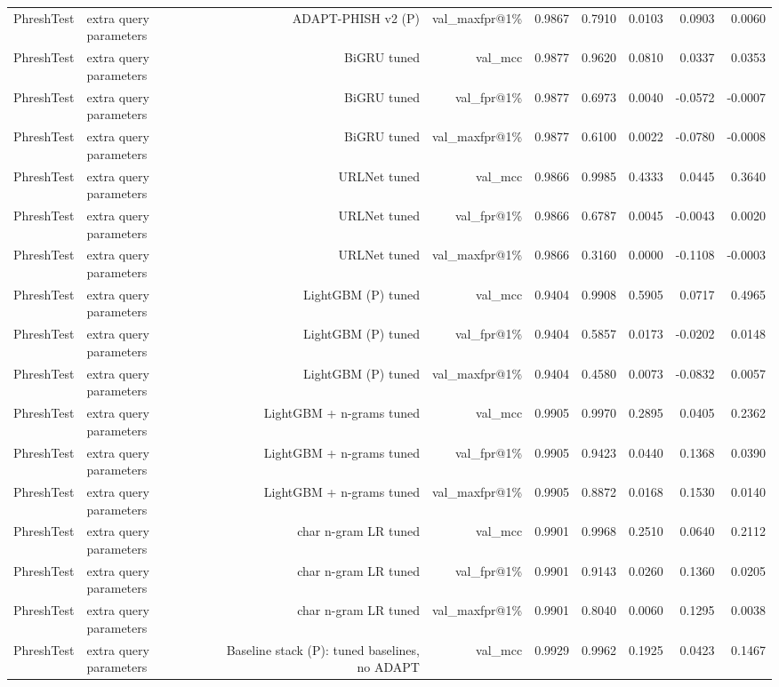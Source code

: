 \begin{table}[t]
\begin{tabular}{llrrrrrrr}
PhreshTest & extra query parameters & ADAPT-PHISH v2 (P) & val\_maxfpr@1\% & 0.9867 & 0.7910 & 0.0103 & 0.0903 & 0.0060 \\
PhreshTest & extra query parameters & BiGRU tuned & val\_mcc & 0.9877 & 0.9620 & 0.0810 & 0.0337 & 0.0353 \\
PhreshTest & extra query parameters & BiGRU tuned & val\_fpr@1\% & 0.9877 & 0.6973 & 0.0040 & -0.0572 & -0.0007 \\
PhreshTest & extra query parameters & BiGRU tuned & val\_maxfpr@1\% & 0.9877 & 0.6100 & 0.0022 & -0.0780 & -0.0008 \\
PhreshTest & extra query parameters & URLNet tuned & val\_mcc & 0.9866 & 0.9985 & 0.4333 & 0.0445 & 0.3640 \\
PhreshTest & extra query parameters & URLNet tuned & val\_fpr@1\% & 0.9866 & 0.6787 & 0.0045 & -0.0043 & 0.0020 \\
PhreshTest & extra query parameters & URLNet tuned & val\_maxfpr@1\% & 0.9866 & 0.3160 & 0.0000 & -0.1108 & -0.0003 \\
PhreshTest & extra query parameters & LightGBM (P) tuned & val\_mcc & 0.9404 & 0.9908 & 0.5905 & 0.0717 & 0.4965 \\
PhreshTest & extra query parameters & LightGBM (P) tuned & val\_fpr@1\% & 0.9404 & 0.5857 & 0.0173 & -0.0202 & 0.0148 \\
PhreshTest & extra query parameters & LightGBM (P) tuned & val\_maxfpr@1\% & 0.9404 & 0.4580 & 0.0073 & -0.0832 & 0.0057 \\
PhreshTest & extra query parameters & LightGBM + n-grams tuned & val\_mcc & 0.9905 & 0.9970 & 0.2895 & 0.0405 & 0.2362 \\
PhreshTest & extra query parameters & LightGBM + n-grams tuned & val\_fpr@1\% & 0.9905 & 0.9423 & 0.0440 & 0.1368 & 0.0390 \\
PhreshTest & extra query parameters & LightGBM + n-grams tuned & val\_maxfpr@1\% & 0.9905 & 0.8872 & 0.0168 & 0.1530 & 0.0140 \\
PhreshTest & extra query parameters & char n-gram LR tuned & val\_mcc & 0.9901 & 0.9968 & 0.2510 & 0.0640 & 0.2112 \\
PhreshTest & extra query parameters & char n-gram LR tuned & val\_fpr@1\% & 0.9901 & 0.9143 & 0.0260 & 0.1360 & 0.0205 \\
PhreshTest & extra query parameters & char n-gram LR tuned & val\_maxfpr@1\% & 0.9901 & 0.8040 & 0.0060 & 0.1295 & 0.0038 \\
PhreshTest & extra query parameters & Baseline stack (P): tuned baselines, no ADAPT & val\_mcc & 0.9929 & 0.9962 & 0.1925 & 0.0423 & 0.1467 \\

\end{tabular}
\end{table}
